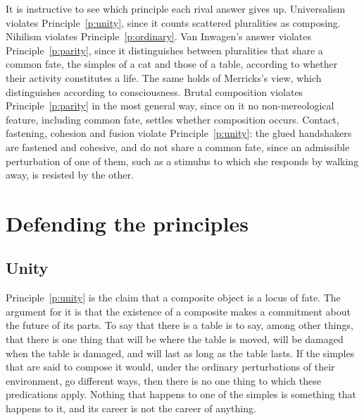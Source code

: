 \documentclass{situationist-preprint}
\begin{document}
It is instructive to see which principle each rival answer gives up. Universalism violates Principle~\ref{p:unity}, since it counts scattered pluralities as composing. Nihilism violates Principle~\ref{p:ordinary}. Van Inwagen's answer violates Principle~\ref{p:parity}, since it distinguishes between pluralities that share a common fate, the simples of a cat and those of a table, according to whether their activity constitutes a life. The same holds of Merricks's view, which distinguishes according to consciousness. Brutal composition violates Principle~\ref{p:parity} in the most general way, since on it no non-mereological feature, including common fate, settles whether composition occurs. Contact, fastening, cohesion and fusion violate Principle~\ref{p:unity}: the glued handshakers are fastened and cohesive, and do not share a common fate, since an admissible perturbation of one of them, such as a stimulus to which she responds by walking away, is resisted by the other.

\section{Defending the principles}

\subsection{Unity}

Principle~\ref{p:unity} is the claim that a composite object is a locus of fate. The argument for it is that the existence of a composite makes a commitment about the future of its parts. To say that there is a table is to say, among other things, that there is one thing that will be where the table is moved, will be damaged when the table is damaged, and will last as long as the table lasts. If the simples that are said to compose it would, under the ordinary perturbations of their environment, go different ways, then there is no one thing to which these predications apply. Nothing that happens to one of the simples is something that happens to it, and its career is not the career of anything.
\end{document}
